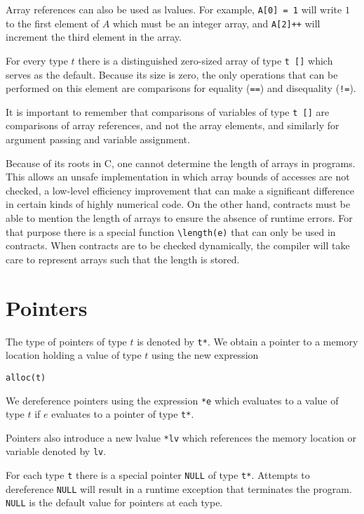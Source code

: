 \documentclass[11pt]{article}
\begin{document}
Array references can also be used as lvalues.  For
example, \lstinline'A[0] = 1' will write $1$ to the first element
of $A$ which must be an integer array, and \lstinline'A[2]++' will
increment the third element in the array.

For every type $t$ there is a distinguished zero-sized array of type
\lstinline't []' which serves as the default.  Because its size is zero,
the only operations that can be performed on this element are
comparisons for equality (\lstinline'==') and disequality (\lstinline'!=').

It is important to remember that comparisons of variables of type
\lstinline't []' are comparisons of array references, and not the
array elements, and similarly for argument passing and variable
assignment.

Because of its roots in C, one cannot determine the length of arrays
in programs.  This allows an unsafe implementation in which array
bounds of accesses are not checked, a low-level efficiency improvement
that can make a significant difference in certain kinds of highly
numerical code.  On the other hand, contracts must be able to mention
the length of arrays to ensure the absence of runtime errors.  For
that purpose there is a special function \lstinline'\length(e)' that
can only be used in contracts.  When contracts are to be checked
dynamically, the compiler will take care to represent arrays such that
the length is stored.

\section{Pointers}

The type of pointers of type $t$ is denoted by \lstinline't*'.
We obtain a pointer to a memory location holding a
value of type $t$ using the new expression
\begin{lstlisting}
alloc(t)
\end{lstlisting}
We dereference pointers using the expression \lstinline'*e'
which evaluates to a value of type $t$ if
$e$ evaluates to a pointer of type \lstinline't*'.

Pointers also introduce a new lvalue \lstinline'*lv' which references
the memory location or variable denoted by \lstinline'lv'.

For each type \lstinline't' there is a special pointer
\lstinline'NULL' of type \lstinline't*'.  Attempts to dereference
\lstinline'NULL' will result in a runtime exception that terminates
the program.  \lstinline'NULL' is the default value for pointers at
each type.
\end{document}
